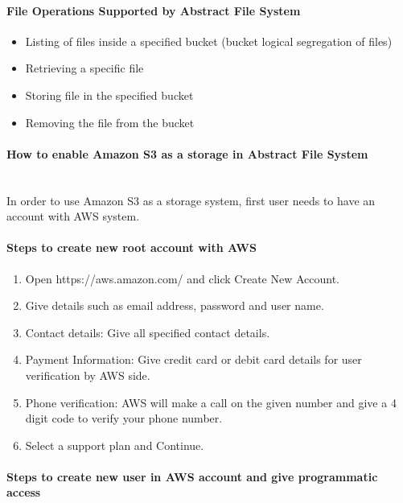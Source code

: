 \paragraph{File Operations Supported by Abstract File System}


\begin{itemize}
    \item   Listing of files inside a specified bucket (bucket logical
segregation of files)
    \item       Retrieving a specific file
    \item       Storing file in  the specified bucket
    \item       Removing the file from the bucket
\end{itemize}



\paragraph{How to enable Amazon S3 as a storage in Abstract File System}

\\
In order to use Amazon S3 as a storage system, first user needs to have an
account with AWS system.


\paragraph{Steps to create new root account with AWS}

\begin{enumerate}
    \item Open https://aws.amazon.com/ and click Create New Account.
    \item Give details such as email address, password and user name.
    \item Contact details: Give all specified contact details.
    \item Payment Information: Give credit card or debit card details for user
verification by AWS side.
    \item       Phone verification: AWS will make a call on the given number
and give a 4 digit code to verify your phone number.
    \item Select a support plan and Continue.
\end{enumerate}


\paragraph{Steps to create new user in AWS account and give programmatic access}


